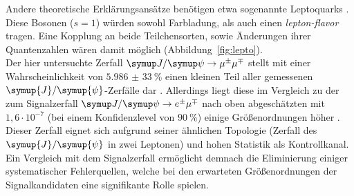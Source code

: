 Andere theoretische Erklärungsansätze benötigen etwa sogenannte Leptoquarks \cite{leptoq}. Diese Bosonen ($s=1$) würden
sowohl Farbladung, als auch einen \textit{lepton-flavor} tragen. Eine Kopplung an beide Teilchensorten, sowie Änderungen
ihrer Quantenzahlen wären damit möglich (Abbildung~\ref{fig:lepto}).\\
Der hier untersuchte Zerfall $\kontroll$ stellt mit einer Wahrscheinlichkeit von $\SI{5,986(33)}{\percent}$ einen kleinen
Teil aller gemessenen $\symup{J}/\symup{\psi}$-Zerfälle dar \cite{pdg}. Allerdings liegt diese im Vergleich zu der zum
Signalzerfall $\signal$ nach oben abgeschätzten mit $1,6\cdot 10^{-7}$ (bei einem Konfidenzlevel von $\SI{90}{\percent}$)
einige Größenordnungen höher \cite{BESIII}. Dieser Zerfall eignet sich aufgrund seiner ähnlichen Topologie (Zerfall des
$\symup{J}/\symup{\psi}$ in zwei Leptonen) und hohen Statistik als Kontrollkanal. Ein Vergleich mit dem Signalzerfall
ermöglicht demnach die Eliminierung einiger systematischer Fehlerquellen, welche bei den erwarteten Größenordnungen der
Signalkandidaten eine signifikante Rolle spielen.
